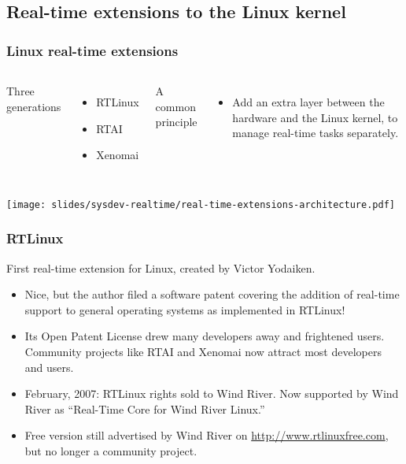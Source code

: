 \subsection{Real-time extensions to the Linux kernel}

\begin{frame}
  \frametitle{Linux real-time extensions}
  \begin{columns}
    Three generations
    \begin{itemize}
    \item RTLinux
    \item RTAI
    \item Xenomai
    \end{itemize}
    A common principle
    \begin{itemize}
    \item Add an extra layer between the hardware and the Linux kernel, to manage
      real-time tasks separately.
    \end{itemize}
  \end{columns}
  \begin{center}
    \texttt{[image: slides/sysdev-realtime/real-time-extensions-architecture.pdf]}
  \end{center}
\end{frame}

\begin{frame}
  \frametitle{RTLinux}
  First real-time extension for Linux, created by Victor Yodaiken.
  \begin{itemize}
  \item Nice, but the author filed a software patent covering the
    addition of real-time support to general operating systems as
    implemented in RTLinux!
  \item Its Open Patent License drew many developers away and
    frightened users.  Community projects like RTAI and Xenomai now
    attract most developers and users.
  \item February, 2007: RTLinux rights sold to Wind River. Now
    supported by Wind River as “Real-Time Core for Wind River Linux.”
  \item Free version still advertised by Wind River on
    \url{http://www.rtlinuxfree.com}, but no longer a community
    project.
  \end{itemize}
\end{frame}

